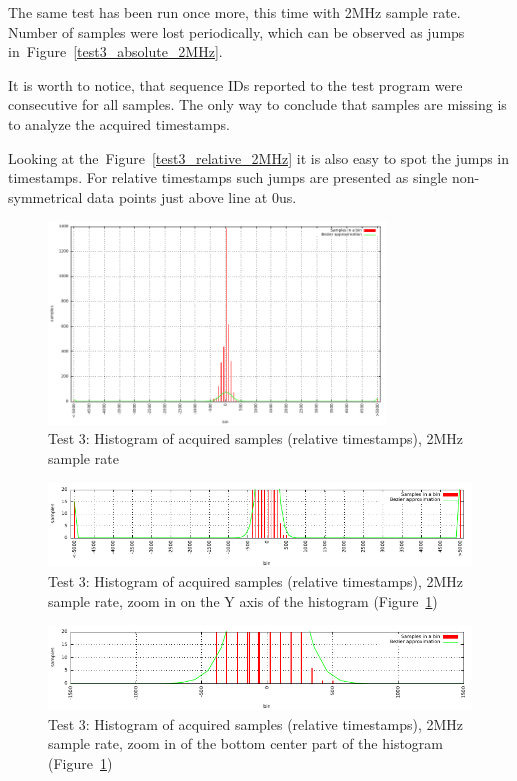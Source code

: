 \documentclass[a4paper, 12pt]{article}
\begin{document}
The same test has been run once more, this time with 2MHz sample rate.
Number of samples were lost periodically, which can be observed as
jumps in~Figure~\ref{test3_absolute_2MHz}.

It is worth to notice, that sequence IDs reported to the test program
were consecutive for all samples.
The only way to conclude that samples are missing is to analyze
the acquired timestamps.

Looking at the~Figure~\ref{test3_relative_2MHz} it is also easy to spot
the jumps in timestamps.
For relative timestamps such jumps are presented as single non-symmetrical
data points just above line at 0us.

\FloatBarrier


\begin{figure}[ht!]
  \centering
  \includegraphics[width=0.80\textwidth]{img/test3_histogram_2MHz.pdf}
  \caption{Test 3: Histogram of acquired samples (relative timestamps),
           2MHz sample rate}
  \label{test3_histogram_2MHz}
\end{figure}

\begin{figure}[ht!]
  \centering
  \includegraphics[width=1\textwidth]{img/test3_histogram_zoomy_2MHz.pdf}
  \caption{Test 3: Histogram of acquired samples (relative timestamps),
           2MHz sample rate, zoom in on the Y axis of the histogram
           (Figure~\ref{test3_histogram_2MHz})}
  \label{test3_histogram_zoomy_2MHz}
\end{figure}

\begin{figure}[ht!]
  \centering
  \includegraphics[width=1\textwidth]{img/test3_histogram_zoomx_2MHz.pdf}
  \caption{Test 3: Histogram of acquired samples (relative timestamps),
           2MHz sample rate, zoom in of the bottom center part of the histogram
           (Figure~\ref{test3_histogram_2MHz})}
  \label{test3_histogram_zoomx_2MHz}
\end{figure}
\end{document}
